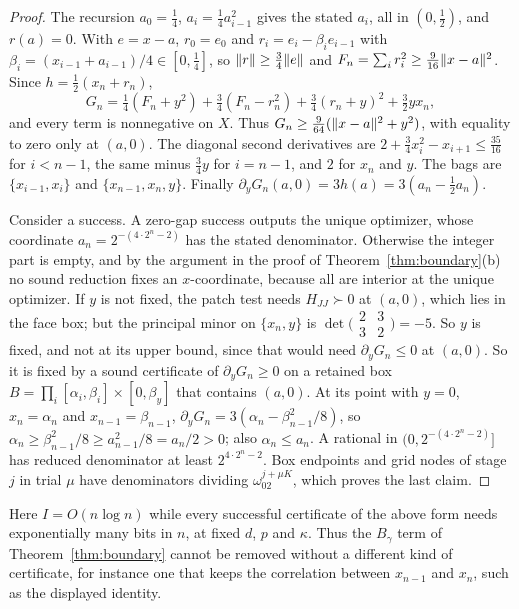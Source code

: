 \begin{proof}
The recursion $a_0=\frac14$, $a_i=\frac14a_{i-1}^2$ gives the stated $a_i$,
all in $(0,\frac12)$, and $r(a)=0$. With $e=x-a$, $r_0=e_0$ and
$r_i=e_i-\beta_ie_{i-1}$ with $\beta_i=(x_{i-1}+a_{i-1})/4\in[0,\frac14]$, so
$\lVert r\rVert\ge\frac34\lVert e\rVert$ and $F_n=\sum_ir_i^2\ge\frac9{16}\lVert x-a\rVert^2$.
Since $h=\frac12(x_n+r_n)$,
\[
G_n=\tfrac14(F_n+y^2)+\tfrac34(F_n-r_n^2)+\tfrac34(r_n+y)^2+\tfrac32yx_n ,
\]
and every term is nonnegative on $X$. Thus
$G_n\ge\frac9{64}(\lVert x-a\rVert^2+y^2)$, with equality to zero only at $(a,0)$.
The diagonal second derivatives are $2+\frac34x_i^2-x_{i+1}\le\frac{35}{16}$
for $i<n-1$, the same minus $\frac34y$ for $i=n-1$, and $2$ for $x_n$ and
$y$. The bags are $\{x_{i-1},x_i\}$ and $\{x_{n-1},x_n,y\}$. Finally
$\partial_yG_n(a,0)=3h(a)=3(a_n-\frac12a_n)$.

Consider a success. A zero-gap success outputs the unique optimizer, whose
coordinate $a_n=2^{-(4\cdot2^n-2)}$ has the stated denominator. Otherwise
the integer part is empty, and by the argument in the proof of
Theorem~\ref{thm:boundary}(b) no sound reduction fixes an $x$-coordinate,
because all are interior at the unique optimizer. If $y$ is not fixed, the
patch test needs $H_{JJ}\succ0$ at $(a,0)$, which lies in the face box; but
the principal minor on $\{x_n,y\}$ is
$\det\bigl(\begin{smallmatrix}2&3\\3&2\end{smallmatrix}\bigr)=-5$. So $y$ is
fixed, and not at its upper bound, since that would need
$\partial_yG_n\le0$ at $(a,0)$. So it is fixed by a sound certificate of
$\partial_yG_n\ge0$ on a retained box
$B=\prod_i[\alpha_i,\beta_i]\times[0,\beta_y]$ that contains $(a,0)$. At its
point with $y=0$, $x_n=\alpha_n$ and $x_{n-1}=\beta_{n-1}$,
$\partial_yG_n=3(\alpha_n-\beta_{n-1}^2/8)$, so
$\alpha_n\ge\beta_{n-1}^2/8\ge a_{n-1}^2/8=a_n/2>0$; also $\alpha_n\le a_n$.
A rational in $(0,2^{-(4\cdot2^n-2)}]$ has reduced denominator at least
$2^{4\cdot2^n-2}$. Box endpoints and grid nodes of stage $j$ in trial $\mu$
have denominators dividing $\omega_02^{j+\mu K}$, which proves the last claim.
\end{proof}

Here $I=O(n\log n)$ while every successful certificate of the above form
needs exponentially many bits in $n$, at fixed $d$, $p$ and $\kappa$. Thus
the $B_\gamma$ term of Theorem~\ref{thm:boundary} cannot be removed without
a different kind of certificate, for instance one that keeps the correlation
between $x_{n-1}$ and $x_n$, such as the displayed identity.

